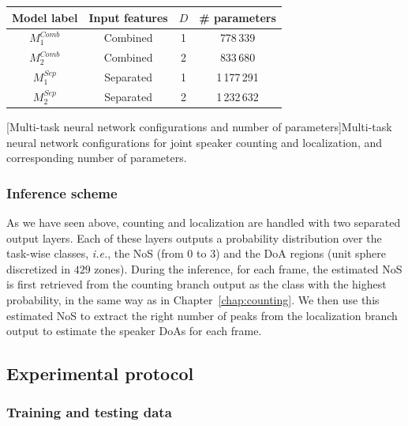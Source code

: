 \begin{table}[t]
\centering
    \begin{tabular}{|c|ccc|}
        \hline
        \textbf{Model label} & \textbf{Input features} & \textbf{$D$} & \textbf{\# parameters} \\ \hline
        $M^{Comb}_1$         & Combined                & 1            & 778\,339               \\
        $M^{Comb}_2$         & Combined                & 2            & 833\,680               \\
        $M^{Sep}_1$          & Separated               & 1            & 1\,177\,291            \\
        $M^{Sep}_2$          & Separated               & 2            & 1\,232\,632            \\ \hline
    \end{tabular}
    
    [Multi-task neural network configurations and number of parameters]{Multi-task neural network configurations for joint speaker counting and localization, and corresponding number of parameters.}
    \label{tab:hybrid_multi-taskParameters}
\end{table}

\subsubsection{Inference scheme}

As we have seen above, counting and localization are handled with two separated output layers. Each of these layers outputs a probability distribution over the task-wise classes, \emph{i.e.}, the NoS (from $0$ to $3$) and the DoA regions (unit sphere discretized in $429$ zones).
During the inference, for each frame, the estimated NoS is first retrieved from the counting branch output as the class with the highest probability, in the same way as in Chapter~\ref{chap:counting}. We then use this estimated NoS to extract the right number of peaks from the localization branch output to estimate the speaker DoAs for each frame. 

\subsection{Experimental protocol}
\subsubsection{Training and testing data}

